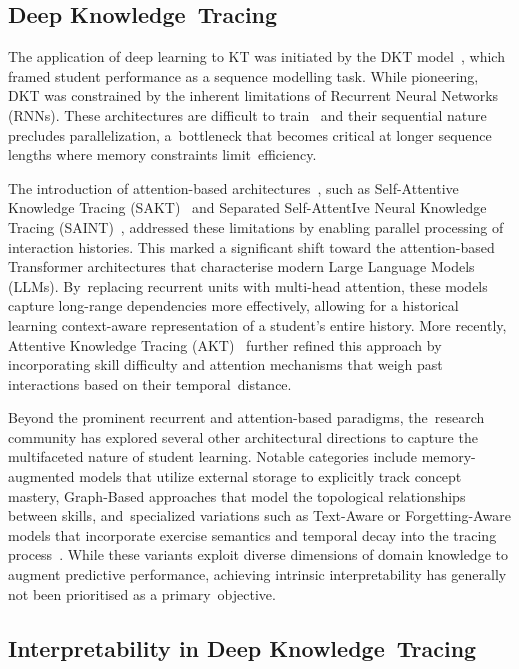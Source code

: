 \documentclass[applsci,article,accept,moreauthors,pdftex]{Definitions/mdpi}
\begin{document}
\subsection{Deep Knowledge~Tracing}

The application of deep learning to KT was initiated by the DKT model~\citep{piech2015deep}, which framed student performance as a sequence {modelling} task. While pioneering, DKT was constrained by the inherent limitations of Recurrent Neural Networks (RNNs). These architectures are difficult to train~\citep{Pascanu20132347} and their sequential nature precludes parallelization, a~bottleneck that becomes critical at longer sequence lengths where memory constraints limit~efficiency. 

The introduction of attention-based architectures~\citep{vaswani2017attention}, such as Self-Attentive Knowledge Tracing (SAKT)~\citep{Pandey2019384} and Separated Self-AttentIve Neural Knowledge Tracing (SAINT)~\citep{choi2020towards}, addressed these limitations by enabling parallel processing of interaction histories. This marked a significant shift toward the attention-based Transformer architectures that {characterise} modern Large Language Models (LLMs). By~replacing recurrent units with multi-head attention, these models capture long-range dependencies more effectively, allowing for a historical learning context-aware representation of a student's entire history. More recently, Attentive Knowledge Tracing (AKT)~\citep{ghosh2020context} further refined this approach by incorporating skill difficulty and attention mechanisms that weigh past interactions based on their temporal~distance. 

Beyond the prominent recurrent and attention-based paradigms, the~research community has explored several other architectural directions to capture the multifaceted nature of student learning. Notable categories include memory-augmented models that utilize external storage to explicitly track concept mastery, Graph-Based approaches that model the topological relationships between skills, and~specialized variations such as Text-Aware or Forgetting-Aware models that incorporate exercise semantics and temporal decay into the tracing process~\citep{abdelrahman2023knowledge}. While these variants exploit diverse dimensions of domain knowledge to augment predictive performance, achieving intrinsic interpretability has generally not been {prioritised} as a primary~objective.

\subsection{Interpretability in Deep Knowledge~Tracing} \label{sec_interpretability}
\end{document}
